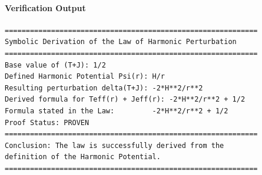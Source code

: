 \paragraph{Verification Output}
\begin{verbatim}
============================================================
Symbolic Derivation of the Law of Harmonic Perturbation
============================================================
Base value of (T+J): 1/2
Defined Harmonic Potential Psi(r): H/r
Resulting perturbation delta(T+J): -2*H**2/r**2
Derived formula for Teff(r) + Jeff(r): -2*H**2/r**2 + 1/2
Formula stated in the Law:         -2*H**2/r**2 + 1/2
Proof Status: PROVEN
============================================================
Conclusion: The law is successfully derived from the
definition of the Harmonic Potential.
============================================================
\end{verbatim}